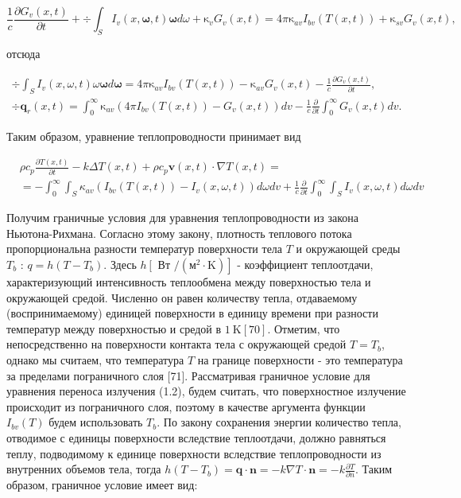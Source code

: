 \documentclass[10pt]{article}
\begin{document}
$$
\frac{1}{c} \frac{\partial G_{v}(x, t)}{\partial t}+\div \int_{S} I_{v}(x, \boldsymbol{\omega}, t) \boldsymbol{\omega} d \omega+\mathrm{\kappa}_{v} G_{v}(x, t)=4 \pi \mathrm{\kappa}_{a v} I_{b v}(T(x, t))+\mathrm{\kappa}_{s v} G_{v}(x, t),
$$

отсюда

$$
\begin{gathered}
\div \int_{S} I_{v}(x, \omega, t) \omega \boldsymbol{\omega} d \boldsymbol{\omega}=4 \pi \mathrm{\kappa}_{a v} I_{b v}(T(x, t))-\mathrm{\kappa}_{a v} G_{v}(x, t)-\frac{1}{c} \frac{\partial G_{v}(x, t)}{\partial t}, \\
\div \mathbf{q}_{r}(x, t)=\int_{0}^{\infty} \mathrm{\kappa}_{a v}\left(4 \pi I_{b v}(T(x, t))-G_{v}(x, t)\right) d v-\frac{1}{c} \frac{\partial}{\partial t} \int_{0}^{\infty} G_{v}(x, t) d v .
\end{gathered}
$$

Таким образом, уравнение теплопроводности принимает вид

$$
\begin{aligned}
&\rho c_{p} \frac{\partial T(x, t)}{\partial t}-k \Delta T(x, t)+\rho c_{p} \mathbf{v}(x, t) \cdot \nabla T(x, t)= \\
&=-\int_{0}^{\infty} \int_{S} \kappa_{a v}\left(I_{b v}(T(x, t))-I_{v}(x, \omega, t)\right) d \omega d v+\frac{1}{c} \frac{\partial}{\partial t} \int_{0}^{\infty} \int_{S} I_{v}(x, \omega, t) d \omega d v
\end{aligned}
$$

Получим граничные условия для уравнения теплопроводности из закона Ньютона-Рихмана. Согласно этому закону, плотность теплового потока пропорциональна разности температур поверхности тела $T$ и окружающей среды $T_{b}$ : $q=h\left(T-T_{b}\right)$. Здесь $h\left[\right.$ Вт $\left./\left(\mathrm{м}^{2} \cdot \mathrm{K}\right)\right]$ - коэффициент теплоотдачи, характеризующий интенсивность теплообмена между поверхностью тела и окружающей средой. Численно он равен количеству тепла, отдаваемому (воспринимаемому) единицей поверхности в единицу времени при разности температур между поверхностью и средой в $1 \mathrm{~K}[70]$. Отметим, что непосредственно на поверхности контакта тела с окружающей средой $T=T_{b}$, однако мы считаем, что температура $T$ на границе поверхности - это температура за пределами пограничного слоя [71]. Рассматривая граничное условие для уравнения переноса излучения (1.2), будем считать, что поверхностное излучение происходит из пограничного слоя, поэтому в качестве аргумента функции $I_{b v}(T)$ будем использовать $T_{b}$. По закону сохранения энергии количество тепла, отводимое с единицы поверхности вследствие теплоотдачи, должно равняться теплу, подводимому к единице поверхности вследствие теплопроводности из внутренних объемов тела, тогда $h\left(T-T_{b}\right)=\mathbf{q} \cdot \mathbf{n}=-k \nabla T \cdot \mathbf{n}=-k \frac{\partial T}{\partial n}$. Таким образом, граничное условие имеет вид:
\end{document}
